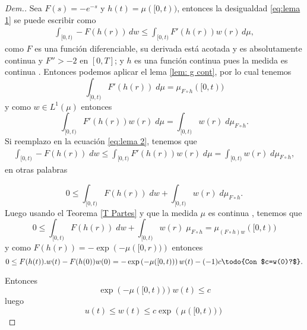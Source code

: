 \begin{proof}[Dem.]
	
 Sea $F(s)=-e^{-s}$ y $h(t)=\mu([0,t))$, entonces la desigualdad \eqref{eq:lema 1} se puede escribir como 
 \begin{equation}
     \begin{split}
         \int_{[0,t)}-F(h(r))\, dw\leq \int_{[0,t)}F'(h(r))w(r)\, d\mu, \label{eq:lema 2}
     \end{split}
 \end{equation}
 como $F$ es una función diferenciable, su derivada está acotada y es absolutamente continua y $F''>-2$ en $[0,T]$; y $h$ es una función continua pues la medida es continua . Entonces podemos aplicar el lema \ref{lem: g cont}, por lo cual tenemos 
 \begin{equation*}
 	\int_{[0,t)} F'(h(r)) \; d\mu= \mu_{F\circ h}([0,t))
 \end{equation*} 
y como $w\in L^1(\mu)$ entonces 
\begin{equation*}
	  \int_{[0,t)} F'(h(r)) w(r)\; d\mu= \int_{[0,t)}w(r)\; d\mu_{F\circ h}.
\end{equation*}
Si reemplazo en la ecuación \eqref{eq:lema 2}, tenemos que
\begin{equation*}
    \begin{split}
	\int_{[0,t)}-F\left( h(r)\right)\; dw \leq \int_{[0,t)}F'\left( h(r)\right)w(r)\; d\mu
	= 	\int_{[0,t)}w(r)\; d\mu_{F\circ h},
 \end{split}
\end{equation*}
en otras palabras

\begin{equation*}
	0\leq\int_{[0,t)}F(h(r))\; dw+  \int_{[0,t)}w(r)\; d\mu_{F\circ h}.
\end{equation*}
 Luego usando el Teorema \ref{T Partes} y que la medida $\mu$ es continua , tenemos que 
\begin{equation*}
	0\leq\int_{[0,t)}F(h(r))\; dw+  \int_{[0,t)}w(r)\; \mu_{F\circ h}=\mu_{(F\circ h)w}([0,t))    
 \end{equation*}
 y como $F(h(r))=-\exp{\left(-\mu([0,r))\right)}$ entonces
 \begin{equation*}
	0\leq F(h(t)).w(t)-F(h(0))w(0)=-\exp\left( -\mu([0,t))\right)w(t) -(-1)c\textrm{\todo{Con $c=w(0)?$}}.
\end{equation*}


Entonces
	$$\exp\left( -\mu([0,t))\right)w(t) \leq c$$
luego 
 $$u(t)\leq w(t)\leq c\exp\left( \mu([0,t))\right) $$
\end{proof}

